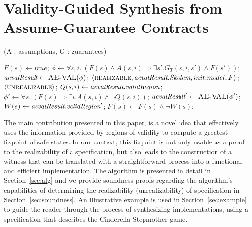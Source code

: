 \section{Validity-Guided Synthesis from Assume-Guarantee Contracts}
\label{sec:synthesis}

\begin{algorithm*}[!t]
\caption{\jsynvg (A : assumptions, G : guarantees)}
\label{alg:synthesis}
\begin{algorithmic}[1]
	\State $F(s) \gets true$;
		\State $\phi \gets \forall s,i. \ (F(s) \land A(s,i) \Rightarrow \exists s'.G_{T}(s,i,s') \land F(s'))$;
		\State $\textit{aevalResult} \gets \textsc{AE-VAL}(\phi)$;
		\If{$\isValid(\aevalres)$}
				\Return $\langle \textsc{realizable}, \textit{aevalResult}.\textit{Skolem}, init.model, F \rangle$;
		 		\Return $\langle \textsc{unrealizable} \rangle$;
		 	\EndIf
			\State $Q(s,i) \gets \textit{aevalResult}.\textit{validRegion}$;
			\State $\phi' \gets \forall s. \ (F(s) \Rightarrow \exists i. A(s,i) \land \lnot
			Q(s,i))$;
			\State $\textit{aevalResult}' \gets \textsc{AE-VAL}(\phi')$;
				\State $W(s) \gets \textit{aevalResult}.\textit{validRegion}'$;
			\State $F(s) \gets F(s) \land \lnot W(s)$;	
			
				
		\EndIf
	\EndWhile
\end{algorithmic}
\end{algorithm*}

The main contribution presented in this paper, is a novel idea that effectively
uses the information provided by regions of validity to compute a
greatest fixpoint of safe states. In our context, this fixpoint is not only
usable as a proof to the realizability of a specification, but also leads to the
construction of a witness that can be translated with a straightforward process
into a functional and efficient implementation. The algorithm is
presented in detail in Section~\ref{sec:alg} and we provide soundness
proofs regarding the algorithm's capabilities of determining the
realizability (unrealizability) of specification in
Section~\ref{sec:soundness}. An illustrative example is used in
Section~\ref{sec:example} to guide the reader through the process of
synthesizing implementations, using a specification that describes the Cinderella-Stepmother game.

